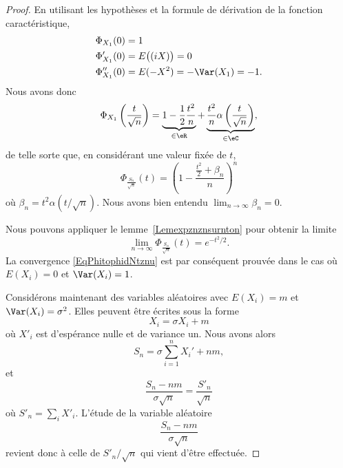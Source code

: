 \begin{proof}
	En utilisant les hypothèses et la formule de dérivation de la fonction caractéristique,
	\begin{subequations}
		\begin{align}
			\Phi_{X_1}(0)   & =1                      \\
			\Phi'_{X_1}(0)  & =E\big( (iX) \big)=0    \\
			\Phi''_{X_1}(0) & =E(-X^2)=-\Var(X_1)=-1.
		\end{align}
	\end{subequations}
	Nous avons donc
	\begin{equation}
		\Phi_{X_1}\left( \frac{ t }{ \sqrt{n} } \right)=\underbrace{1-\frac{ 1 }{2}\frac{ t^2 }{ n }}_{\in\eR}+\underbrace{\frac{ t^2 }{ n }\alpha\left( \frac{ t }{ \sqrt{n} } \right)}_{\in\eC},
	\end{equation}
	de telle sorte que, en considérant une valeur fixée de \( t\),
	\begin{equation}        \label{EqPhifracfacbetanrigh}
		\Phi_{\frac{ S_n }{ \sqrt{n} }}(t)=\left( 1-\frac{ \frac{ t^2 }{ 2 }+\beta_n }{ n } \right)^n
	\end{equation}
	où \( \beta_n=t^2\alpha(t/\sqrt{n})\). Nous avons bien entendu \( \lim_{n\to \infty} \beta_n=0\).

	Nous pouvons appliquer le lemme~\ref{Lemexpznznsurnton} pour obtenir la limite
	\begin{equation}        \label{EqlimninfySnsqrtntdsnd}
		\lim_{n\to \infty} \Phi_{\frac{ S_n }{ \sqrt{n} }}(t)= e^{-t^2/2}.
	\end{equation}
	La convergence \eqref{EqPhitophidNtznu} est par conséquent prouvée dans le cas où \( E(X_i)=0\) et \( \Var(X_i)=1\).

	Considérons maintenant des variables aléatoires avec \( E(X_i)=m\) et \( \Var(X_i)=\sigma^2\). Elles peuvent être écrites sous la forme
	\begin{equation}
		X_i=\sigma X_i+m
	\end{equation}
	où \( X'_i\) est d'espérance nulle et de variance un. Nous avons alors
	\begin{equation}
		S_n=\sigma\sum_{i=1}^nX_i'+nm,
	\end{equation}
	et
	\begin{equation}
		\frac{ S_n-nm }{ \sigma\sqrt{n} }=\frac{ S'_n }{ \sqrt{n} }
	\end{equation}
	où \( S'_n=\sum_iX'_i\). L'étude de la variable aléatoire
	\begin{equation}
		\frac{ S_n-nm }{ \sigma\sqrt{n} }
	\end{equation}
	revient donc à celle de \( S'_n/\sqrt{n}\) qui vient d'être effectuée.
\end{proof}

